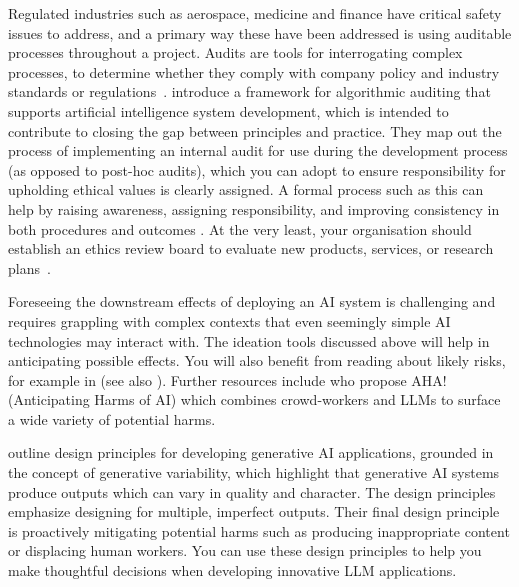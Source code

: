 Regulated industries such as aerospace, medicine and finance have critical safety issues to address, and a primary way these have been addressed is using auditable processes throughout a project. Audits are tools for interrogating complex processes, to determine whether they comply with company policy and industry standards or regulations~\citep{liu2012enterprise}. \citet{raji_closing_2020} introduce a framework for algorithmic auditing that supports artificial intelligence system development, which is intended to contribute to closing the gap between principles and practice. They map out the process of implementing an internal audit for use during the development process (as opposed to post-hoc audits), which you can adopt to ensure responsibility for upholding ethical values is clearly assigned. A formal process such as this can help by raising awareness, assigning responsibility, and improving consistency in both procedures and outcomes \citep{leidner_ethical_2017}. At the very least, your organisation should establish an ethics review board to evaluate new products, services, or research plans~\citep{raji_closing_2020}.



Foreseeing the downstream effects of deploying an AI system is challenging and requires grappling with complex contexts that even seemingly simple AI technologies may interact with. The ideation tools discussed above will help in anticipating possible effects. You will also benefit from reading about likely risks, for example in \citet{Solaiman_Evaluating_2024} (see also ). Further resources include \citet{bucinca_aha_2023} who propose AHA! (Anticipating Harms of AI) which combines crowd-workers and LLMs to surface a wide variety of potential harms.

\citet{weisz_toward_2023} outline design principles for developing generative AI applications, grounded in the concept of generative variability, which highlight that generative AI systems produce outputs which can vary in quality and character. The design principles emphasize designing for multiple, imperfect outputs. Their final design principle is proactively mitigating potential harms such as producing inappropriate content or displacing human workers. You can use these design principles to help you make thoughtful decisions when developing innovative LLM applications.


